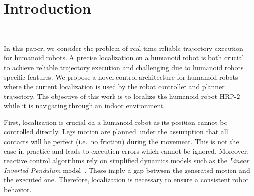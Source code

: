 \section{Introduction}~\label{sec:introduction}

In this paper, we consider the problem of real-time reliable
trajectory execution for humanoid robots. A precise localization on a
humanoid robot is both crucial to achieve reliable trajectory
execution and challenging due to humanoid robots specific features. We
propose a novel control architecture for humanoid robots where the
current localization is used by the robot controller and planner
trajectory. The objective of this work is to localize the humanoid robot
HRP-2~\cite{Kaneko04icra} while it is navigating through an indoor
environment.

First, localization is crucial on a humanoid robot as its position
cannot be controlled directly. Legs motion are planned under the
assumption that all contacts will be perfect (i.e.\ no friction)
during the movement. This is not the case in practice and leads to
execution errors which cannot be ignored. Moreover, reactive control
algorithms rely on simplified dynamics models such as the
\textit{Linear Inverted Pendulum} model~\cite{Kajita01iros}. These
imply a gap between the generated motion and the executed
one. Therefore, localization is necessary to ensure a consistent robot
behavior.

